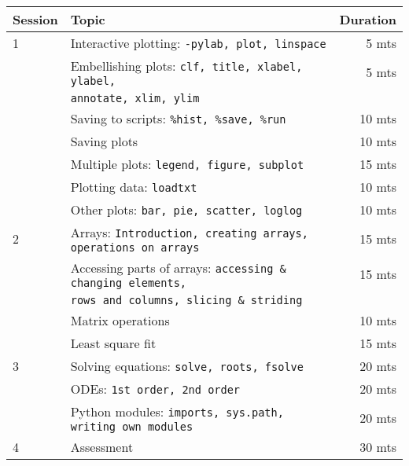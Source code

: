 \documentclass{article}
\begin{document}
\begin{tabular}{llr}
\hline
Session & Topic & Duration\\\hline
1 & Interactive plotting: \tt{-pylab, plot, linspace}                     & ~5 mts\\
  & Embellishing plots: \tt{clf, title, xlabel, ylabel,}                  & ~5 mts\\
  & \tt{annotate, xlim, ylim}                                             &\\
  & Saving to scripts: \tt{\%hist, \%save, \%run}                         & 10 mts\\
  & Saving plots                                                          & 10 mts\\
  & Multiple plots: \tt{legend, figure, subplot}                          & 15 mts\\
  & Plotting data: \tt{loadtxt}                                           & 10 mts\\
  & Other plots: \tt{bar, pie, scatter, loglog}                           & 10 mts\\\hline

2 & Arrays: \tt{Introduction, creating arrays, operations on arrays}      & 15 mts\\
  & Accessing parts of arrays: \tt{accessing \& changing elements,}       & 15 mts\\
  & \tt{rows and columns, slicing \& striding}                            &\\
  & Matrix operations                                                     & 10 mts\\
  & Least square fit                                                      & 15 mts\\\hline

3 & Solving equations: \tt{solve, roots, fsolve}                          & 20 mts\\
  & ODEs: \tt{1st order, 2nd order}                                       & 20 mts\\
  & Python modules: \tt{imports, sys.path, writing own modules}           & 20 mts\\\hline

4 & Assessment                                                            & 30 mts\\\hline\hline
\end{tabular}  
\end{document}
